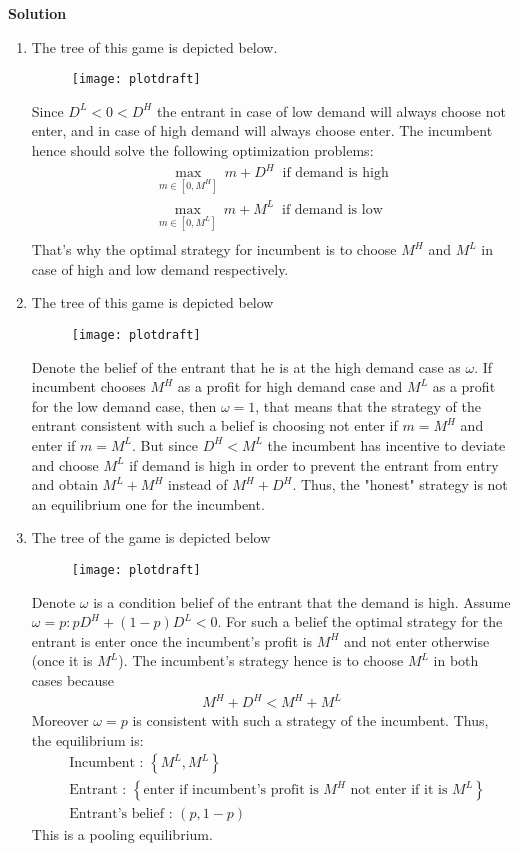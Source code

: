 \documentclass[a4paper]{article}
\begin{document}
\textbf{Solution}
\begin{enumerate}
	\item The tree of this game is depicted below.
		\begin{figure}[H]
		\centering
		\texttt{[image: plotdraft]}
		\caption{}\label{fig1}
	\end{figure}
Since $D^L < 0 < D^H$ the entrant in case of low demand will always choose not enter, and in case of high demand will always choose enter. The incumbent hence should solve the following optimization problems:
\begin{align*}
\underset{m \in [0, M^H]}{\max}\ m+D^H\ \text{ if demand is high}\\
\underset{m \in [0, M^L]}{\max}\ m+M^L\ \text{ if demand is low}\\
\end{align*}
That's why the optimal strategy for incumbent is to choose $M^H$ and $M^L$ in case of high and low demand respectively.
\item The tree of this game is depicted below
		\begin{figure}[H]
	\centering
	\texttt{[image: plotdraft]}
	\caption{}\label{fig2}
\end{figure}
Denote the belief of the entrant that he is at the high demand case as $\omega$. If incumbent chooses $M^H$ as a profit for high demand case and $M^L$ as a profit for the low demand case, then $\omega = 1$, that means that the strategy of the entrant consistent with such a belief is choosing not enter if $m = M^H$ and enter if $m = M^L$. But since $D^H < M^L$ the incumbent has incentive to deviate and choose $M^L$ if demand is high in order to prevent the entrant from entry and obtain $M^L + M^H$ instead of $M^H + D^H$. Thus, the "honest" strategy is not an equilibrium one for the incumbent.
\item The tree of the game is depicted below
\begin{figure}[H]
	\centering
	\texttt{[image: plotdraft]}
	\caption{}\label{fig3}
\end{figure}
Denote $\omega$ is a condition belief of the entrant that the demand is high. Assume $\omega = p: pD^H + (1-p)D^L < 0$. For such a belief the optimal strategy for the entrant is enter once the incumbent's profit is $M^H$ and not enter otherwise (once it is $M^L$). The incumbent's strategy hence is to choose $M^L$ in both cases because
\begin{align*}
M^H + D^H < M^H + M^L
\end{align*}
Moreover $\omega = p$ is consistent with such a strategy of the incumbent. Thus, the equilibrium is:
\begin{align*}
&\text{Incumbent : } \left\{M^L, M^L\right\}\\
&\text{Entrant : } \left\{\text{enter if incumbent's profit is } M^H \text{ not enter if it is } M^L\right\}\\
&\text{Entrant's belief : } (p, 1-p)
\end{align*}
This is a pooling equilibrium.
\end{enumerate}
\end{document}
